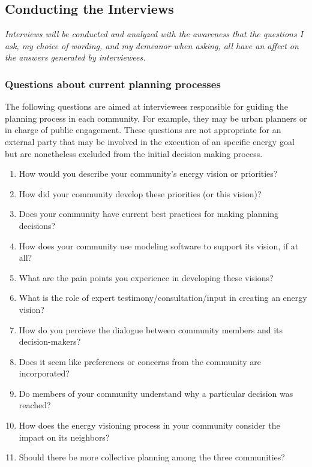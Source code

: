 \subsection{Conducting the Interviews}

\textit{Interviews will be conducted and analyzed with the awareness that the
questions I ask, my choice of wording, and my demeanor when asking, all have an
affect on the answers generated by interviewees.}

\subsubsection{Questions about current planning processes}
The following questions are aimed at interviewees responsible for guiding the
planning process in each community. For example, they may be urban planners or
in charge of public engagement. These questions are not appropriate for an
external party that may be involved in the execution of an specific energy goal
but are nonetheless excluded from the initial decision making process.

\begin{enumerate}
    \item How would you describe your community's energy vision or priorities?
    \item How did your community develop these priorities (or this vision)?
    \item Does your community have current best practices for making planning
    decisions?
    \item How does your community use modeling software to support its vision,
    if at all?
    \item What are the pain points you experience in developing these visions?
    \item What is the role of expert testimony/consultation/input in creating an
    energy vision?
    \item How do you percieve the dialogue between community members and its
    decision-makers?
    \item Does it seem like preferences or concerns from the community are
    incorporated? 
    \item Do members of your community understand why a particular decision was
    reached?
    \item How does the energy visioning process in your community consider the
    impact on its neighbors?
    \item Should there be more collective planning among the three communities?
\end{enumerate}

